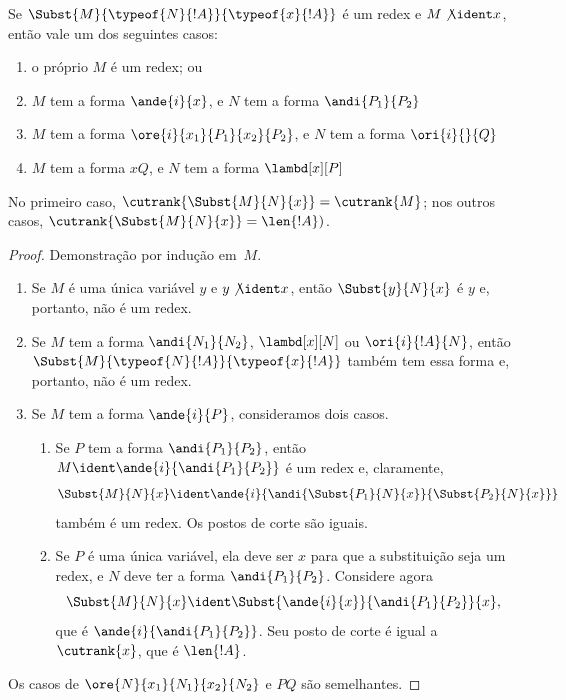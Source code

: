 \documentclass[../../../include/open-logic-section]{subfiles}
\begin{document}
\begin{lem}
  Se $\Subst{M}{\typeof{N}{!A}}{\typeof{x}{!A}}$ é um redex e $M
  \not\ident x$, então vale um dos seguintes casos:
  \begin{enumerate}
  \item o próprio $M$ é um redex; ou
  \item $M$ tem a forma $\ande{i}{x}$, e $N$ tem a forma
    $\andi{P_1}{P_2}$
  \item $M$ tem a forma $\ore{i}{x_1}{P_1}{x_2}{P_2}$, e $N$ tem
    a forma $\ori{i}{}{Q}$
  \item $M$ tem a forma $x Q$, e $N$ tem a forma
    $\lambd[x][P]$
  \end{enumerate}
  No primeiro caso, $\cutrank{\Subst{M}{N}{x}} = \cutrank{M}$; nos
  outros casos, $\cutrank{\Subst{M}{N}{x}} = \len{!A})$.
\end{lem}
\begin{proof}
  Demonstração por indução em~$M$.
  \begin{enumerate}
  \item Se $M$ é uma única variável $y$ e $y \not\ident x$, então
    $\Subst{y}{N}{x}$ é $y$ e, portanto, não é um redex.
  \item Se $M$ tem a forma $\andi{N_1}{N_2}$, $\lambd[x][N]$ ou
    $\ori{i}{!A}{N}$, então $\Subst{M}{\typeof{N}{!A}}{\typeof{x}{!A}}$
    também tem essa forma e, portanto, não é um redex.
  \item Se $M$ tem a forma $\ande{i}{P}$, consideramos dois casos.
    \begin{enumerate}
      \item Se $P$ tem a forma $\andi{P_1}{P_2}$, então $M \ident
        \ande{i}{\andi{P_1}{P_2}}$ é um redex e, claramente,
        \[
        \Subst{M}{N}{x} \ident
        \ande{i}{\andi{\Subst{P_1}{N}{x}}{\Subst{P_2}{N}{x}}}
        \]
        também é um redex. Os postos de corte são iguais.
      \item Se $P$ é uma única variável, ela deve ser $x$ para que a
        substituição seja um redex, e $N$ deve ter a forma
        $\andi{P_1}{P_2}$. Considere agora
        \[
        \Subst{M}{N}{x} \ident \Subst{\ande{i}{x}}{\andi{P_1}{P_2}}{x},
        \]
        que é $\ande{i}{\andi{P_1}{P_2}}$. Seu posto de corte é igual a
        $\cutrank{x}$, que é $\len{!A}$.
    \end{enumerate}
  \end{enumerate}
  Os casos de $\ore{N}{x_1}{N_1}{x_2}{N_2}$ e $P Q$ são semelhantes.
\end{proof}
\end{document}
